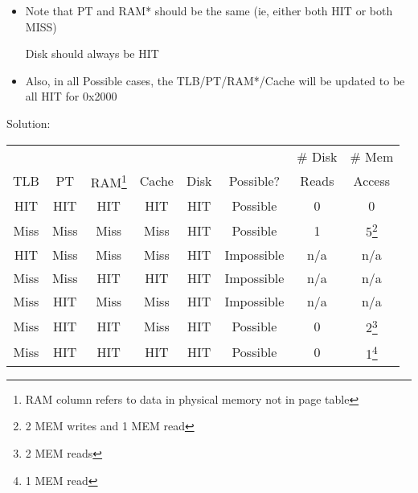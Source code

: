 \begin{frame}[fragile]
\begin{itemize}
\begin{itemize}
	\item Row 6: Possible, no disk reads, 2 memory reads
	\item Row 7: Possible, no disk reads, 1 memory read
	\end{itemize}
\item Note that PT and RAM* should be the same (ie, either both HIT or both MISS)

		Disk should always be HIT

\item Also, in all Possible cases, the TLB/PT/RAM*/Cache will be updated to be all HIT for 0x2000
\end{itemize}
\fi\ENotes
\end{frame}

\begin{frame}{Solution:}
    \begin{center}
\begin{tabular}{ccccc|ccc}
& & & & & & \# Disk & \# Mem\\
TLB & PT &RAM\footnote{RAM column refers to data in physical memory not in page table} & Cache & Disk & Possible? & Reads & Access\\
\hline
HIT & HIT & HIT & HIT & HIT & Possible & 0 & 0 \\
Miss & Miss & Miss & Miss & HIT & Possible & 1 & 5\footnote{2 MEM writes and 1 MEM read} \\
HIT & Miss & Miss & Miss & HIT &Impossible & n/a & n/a\\
	\hline
Miss & Miss & HIT & HIT & HIT &Impossible & n/a & n/a\\
Miss & HIT & Miss & Miss & HIT &Impossible & n/a & n/a\\
Miss & HIT & HIT & Miss & HIT &Possible & 0 & 2\footnote{2 MEM reads}\\
	\hline
Miss & HIT & HIT & HIT & HIT & Possible & 0 & 1\footnote{1 MEM read}\\
\end{tabular}
\end{center}
\end{frame}

